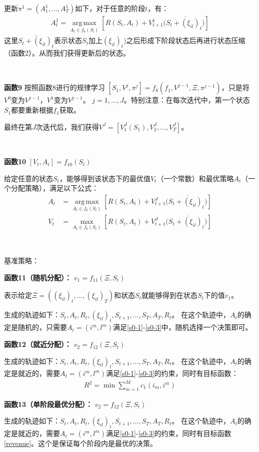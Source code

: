 \documentclass[a4paper,11pt]
{elsarticle}%
\newcommand{\nb}{\nonumber}
\begin{document}
更新$\pi^1=(A^1_1,\ldots,A^1_T)$如下，对于任意的阶段$t$，有：
\begin{align}\label{A}
A_t^1=\operatorname*{arg\,max}\limits_{A_t\in f_6(S_t)}[{R}({S}_t,{A}_t)+V^1_{t+1}(\overline{S_t+(\xi_{il})_t)}]
\end{align}
这里$\overline{S_t+(\xi_{il})_t}$表示状态$S_t$加上$(\xi_{il})_t)$之后形成下阶段状态后再进行状态压缩（函数2）。从而我们获得更新后的状态。

~

\textbf{函数9 }
按照函数8进行的规律学习
$[S_1,V^{j},\pi^j]=f_8(f_1,V^{j-1},\Xi,\pi^{j-1})$，只是将$V^0$变为$V^{j-1}$，$V^1$变为$V^{j-1}$。
$j=1,\ldots,J$。特别注意：在每次迭代中，第一个状态$S_1$都要重新根据$f_1$获取。

最终在第$J$次迭代后，我们获得$V^J=[V_1^J(S_1),V_2^J
,\ldots,V_T^J]$。

~

\textbf{函数10 }
$[V_t,A_t]=f_{10}(S_t)$

给定任意的状态$S_t$，能够得到该状态下的最优值$V_t$（一个常数）和最优策略$A_t$（一个分配策略），满足以下公式：
\begin{align}\label{A2}
A_t&=\operatorname*{arg\,max}\limits_{A_t\in f_6(S_t)}[{R}({S}_t,{A}_t)+V^J_{t+1}(\overline{S_t+(\xi_{il})_t)}]\nb\\
V_t&=\max\limits_{A_t\in f_6(S_t)}[{R}({S}_t,{A}_t)+V^J_{t+1}(\overline{S_t+(\xi_{il})_t)}]
\end{align}


~

基准策略：

\textbf{函数11（随机分配）：}
$v_1=f_{11}(\Xi,S_t)$

表示给定$\Xi=((\xi_{il})_t,\ldots,(\xi_{il})_T)$和状态$S_t$就能够得到在状态$S_t$下的值$v_1$。

生成的轨迹如下：$S_t,A_t,R_t,(\xi_{il})_t,S_{t+1},\ldots,S_{T},A_{T},R_t$。
在这个轨迹中，$A_t$的确定是随机的，只需要$A_t=(i^m,l^m)$满足\eqref{s0-1}-\eqref{s0-3}中，随机选择一个决策即可。


\textbf{函数12（就近分配）：}
$v_2=f_{12}(\Xi,S_t)$

生成的轨迹如下：$S_t,A_t,R_t,(\xi_{il})_t,S_{t+1},\ldots,S_{T},A_{T},R_t$。
在这个轨迹中，$A_t$的确定是就近的，需要$A_t=(i^m,l^m)$满足\eqref{s0-1}-\eqref{s0-3}的约束，同时有目标函数：
\begin{align}
    R^2=\min\sum\limits_{m=1}^M c_1(i_m,i^m)
\end{align}


\textbf{函数13（单阶段最优分配）：}
$v_2=f_{12}(\Xi,S_t)$

生成的轨迹如下：$S_t,A_t,R_t,(\xi_{il})_t,S_{t+1},\ldots,S_{T},A_{T},R_t$。
在这个轨迹中，$A_t$的确定是就近的，需要$A_t=(i^m,l^m)$满足\eqref{s0-1}-\eqref{s0-3}的约束，同时有目标函数\eqref{revenue}。这个是保证每个阶段内是最优的决策。
\end{document}
